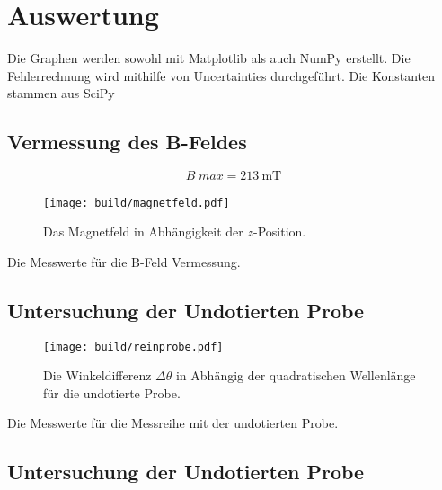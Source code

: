 \section{Auswertung}
\label{sec:Auswertung}

Die Graphen werden sowohl mit Matplotlib \cite{matplotlib} als auch NumPy \cite{numpy} erstellt. Die Fehlerrechnung wird mithilfe von Uncertainties \cite{uncertainties} durchgeführt. Die Konstanten stammen aus SciPy \cite{scipy}

\subsection{Vermessung des B-Feldes}

\[
B_.{max}=\SI{213}{\milli\tesla}
\]

\begin{figure}
	\centering
	\texttt{[image: build/magnetfeld.pdf]}
	\caption{Das Magnetfeld in Abhängigkeit der $z$-Position.}
	\label{fig:B}
\end{figure}

\begin{table}
	\centering
	\caption{Die Messwerte für die B-Feld Vermessung.}
	
	
	\label{tab:B}
\end{table}

\subsection{Untersuchung der Undotierten Probe}

\begin{figure}
	\centering
	\texttt{[image: build/reinprobe.pdf]}
	\caption{Die Winkeldifferenz $\Delta\theta$ in Abhängig der quadratischen Wellenlänge für die undotierte Probe.}
	\label{fig:undot}
\end{figure}

\begin{table}
	\centering
	\caption{Die Messwerte für die Messreihe mit der undotierten Probe.}
	
	\label{tab:undot}
\end{table}

\subsection{Untersuchung der Undotierten Probe}

